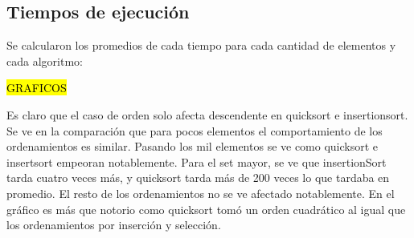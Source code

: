 \documentclass[article,a4paper]{article}
\begin{document}
\subsection{Tiempos de ejecución}

Se calcularon los promedios de cada tiempo para cada cantidad de elementos y cada algoritmo:

\begin{table}[h]
\centering
\caption{Tiempos promedio sobre 10 sets aleatorios}
\end{table}

\hl{GRAFICOS}

Es claro que el caso de orden solo afecta descendente en quicksort e insertionsort.
Se ve en la comparación que para pocos elementos el comportamiento de los ordenamientos es similar. Pasando los mil elementos se ve como quicksort e insertsort empeoran notablemente. Para el set mayor, se ve que insertionSort tarda cuatro veces más, y quicksort tarda más de 200 veces lo que tardaba en promedio. El resto de los ordenamientos no se ve afectado notablemente.
En el gráfico es más que notorio como quicksort tomó un orden cuadrático al igual que los ordenamientos por inserción y selección.
\end{document}
